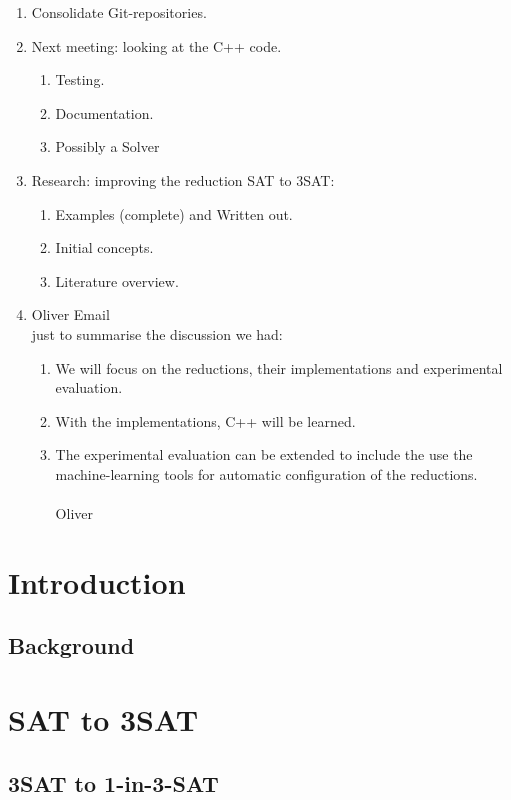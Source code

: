 \documentclass[a4paper]{report}
\begin{document}
\begin{enumerate}
\item Consolidate Git-repositories.
\item Next meeting: looking at the C++ code.
  \begin{enumerate}
  \item Testing.
  \item Documentation.
  \item Possibly a Solver
  \end{enumerate}
\item Research: improving the reduction SAT to 3SAT:
  \begin{enumerate}
  \item Examples (complete) and Written out.
  \item Initial concepts.
  \item Literature overview.
  \end{enumerate}
\item Oliver Email\\
 just to summarise the discussion we had:
  \begin{enumerate}
     \item We will focus on the reductions, their implementations and experimental evaluation.
    \item With the implementations, C++ will be learned.
    \item The experimental evaluation can be extended to include the use the machine-learning tools for automatic configuration of the reductions.\\ \\ Oliver
  \end{enumerate}
\end{enumerate}




\chapter {Introduction}
\label{cha:Introduction}

\section{Background}
\label{sec:Background}



\chapter{SAT to 3SAT}
\label{cha:sat13}

\section{3SAT to 1-in-3-SAT}
\label{sec:3satto13}





\end{document}
